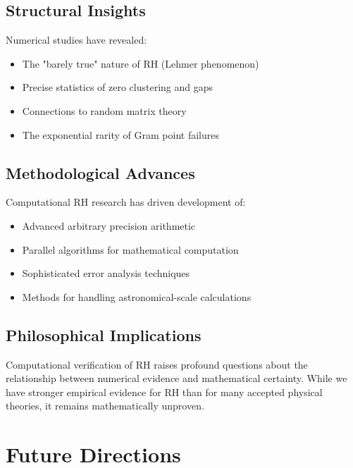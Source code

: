 \subsection{Structural Insights}

\begin{theorem}
Numerical studies have revealed:
\begin{itemize}
\item The "barely true" nature of RH (Lehmer phenomenon)
\item Precise statistics of zero clustering and gaps  
\item Connections to random matrix theory
\item The exponential rarity of Gram point failures
\end{itemize}
\end{theorem}

\subsection{Methodological Advances}

Computational RH research has driven development of:
\begin{itemize}
\item Advanced arbitrary precision arithmetic
\item Parallel algorithms for mathematical computation
\item Sophisticated error analysis techniques
\item Methods for handling astronomical-scale calculations
\end{itemize}

\subsection{Philosophical Implications}

\begin{remark}
Computational verification of RH raises profound questions about the relationship between numerical evidence and mathematical certainty. While we have stronger empirical evidence for RH than for many accepted physical theories, it remains mathematically unproven.
\end{remark}

\section{Future Directions}
\label{sec:future-directions}

